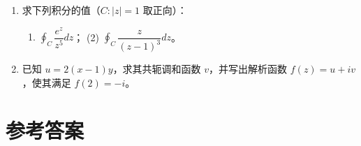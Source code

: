 \begin{enumerate}
  \begin{enumerate}
  \def\labelenumii{(\arabic{enumii})}
  \tightlist
  \item
    \(\displaystyle\int_C\dfrac{e^z}{z-2}dz,\ C:|z-2|=1\)；
  \item
    \(\displaystyle\oint_C\dfrac{dz}{z^2-a^2},\ C:|z-a|=a\)；
  \item
    \(\displaystyle\int_C\dfrac{e^{iz}}{z+i}dz,\ C:|z-2i|=\dfrac32\)；
  \item
    \(\displaystyle\oint_C\dfrac{dz}{z(z-1)(z-2)},\ C:|z|=r<1\)；
  \item
    \(\displaystyle\oint_C\dfrac{\cos z}{z^3}dz,\ C\) 为包围 \(z=0\)
    的简单闭曲线；
  \item
    \(\displaystyle\int_C\dfrac{\sin z}{z}dz,\ C:|z|=1\)。
  \end{enumerate}
\item
  求下列积分的值（\(C:|z|=1\) 取正向）：

  \begin{enumerate}
  \def\labelenumii{(\arabic{enumii})}
  \tightlist
  \item
    \(\displaystyle\oint_C\dfrac{e^z}{z^5}dz\)； (2)
    \(\displaystyle\oint_C\dfrac{z}{(z-1)^3}dz\)。
  \end{enumerate}
\item
  已知 \(u=2(x-1)y\)，求其共轭调和函数 \(v\)，并写出解析函数
  \(f(z)=u+iv\)，使其满足 \(f(2)=-i\)。
\end{enumerate}

\section{参考答案}\label{ux53c2ux8003ux7b54ux6848-2}

